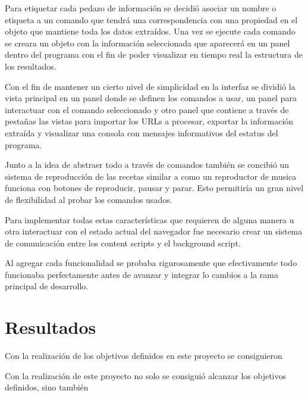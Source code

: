 \documentclass[12pt]{report}
\begin{document}
Para etiquetar cada pedazo de información se decidió asociar un nombre o etiqueta a un comando que tendrá una correspondencia con una propiedad en el objeto que mantiene toda los datos extraídos. Una vez se ejecute cada comando se creara un objeto con la información seleccionada que aparecerá en un panel dentro del programa con el fin de poder visualizar en tiempo real la estructura de los resultados.

Con el fin de mantener un cierto nivel de simplicidad en la interfaz se dividió la vista principal en un panel donde se definen los comandos a usar, un panel para interactuar con el comando seleccionado y otro panel que contiene a través de pestañas las vistas para importar los URLs a procesar, exportar la información extraída y visualizar una consola con mensajes informativos del estatus del programa.


Junto a la idea de abstraer todo a través de comandos también se concibió un sistema de reproducción de las recetas similar a como un reproductor de musica funciona con botones de reproducir, pausar y parar. Esto permitiría un gran nivel de flexibilidad al probar los comandos usados.

Para implementar todas estas características que requieren de alguna manera u otra interactuar con el estado actual del navegador fue necesario crear un sistema de comunicación entre los content scripts y el background script.

Al agregar cada funcionalidad se probaba rigurosamente que efectivamente todo funcionaba perfectamente antes de avanzar y integrar lo cambios a la rama principal de desarrollo.

\break



\break


\chapter{Resultados}

Con la realización de los objetivos definidos en este proyecto se consiguieron 

Con la realización de este proyecto no solo se consiguió alcanzar los objetivos definidos, sino también 
\end{document}
